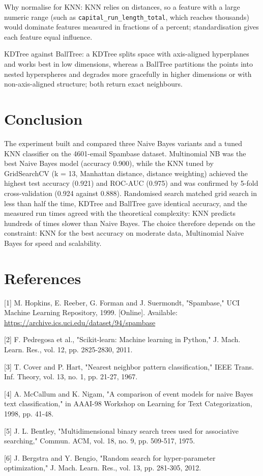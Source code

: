 \documentclass[11pt]{article}
\begin{document}
Why normalise for KNN: KNN relies on distances, so a feature with a large numeric range
(such as \texttt{capital\_run\_length\_total}, which reaches thousands) would dominate features
measured in fractions of a percent; standardisation gives each feature equal influence.

KDTree against BallTree: a KDTree splits space with axis-aligned hyperplanes and works best
in low dimensions, whereas a BallTree partitions the points into nested hyperspheres and
degrades more gracefully in higher dimensions or with non-axis-aligned structure; both
return exact neighbours.

\section*{Conclusion}
\label{sec:org12415b3}


The experiment built and compared three Naive Bayes variants and a tuned KNN classifier on
the 4601-email Spambase dataset. Multinomial NB was the best Naive Bayes model (accuracy
0.900), while the KNN tuned by GridSearchCV (k = 13, Manhattan distance, distance weighting)
achieved the highest test accuracy (0.921) and ROC-AUC (0.975) and was confirmed by 5-fold
cross-validation (0.924 against 0.888). Randomised search matched grid search in less than
half the time, KDTree and BallTree gave identical accuracy, and the measured run times
agreed with the theoretical complexity: KNN predicts hundreds of times slower than Naive
Bayes. The choice therefore depends on the constraint: KNN for the best accuracy on moderate
data, Multinomial Naive Bayes for speed and scalability.

\section*{References}
\label{sec:org562d9f9}


[1] M. Hopkins, E. Reeber, G. Forman and J. Suermondt, "Spambase," UCI Machine Learning Repository, 1999. [Online]. Available: \url{https://archive.ics.uci.edu/dataset/94/spambase}

[2] F. Pedregosa et al., "Scikit-learn: Machine learning in Python," J. Mach. Learn. Res., vol. 12, pp. 2825-2830, 2011.

[3] T. Cover and P. Hart, "Nearest neighbor pattern classification," IEEE Trans. Inf. Theory, vol. 13, no. 1, pp. 21-27, 1967.

[4] A. McCallum and K. Nigam, "A comparison of event models for naive Bayes text classification," in AAAI-98 Workshop on Learning for Text Categorization, 1998, pp. 41-48.

[5] J. L. Bentley, "Multidimensional binary search trees used for associative searching," Commun. ACM, vol. 18, no. 9, pp. 509-517, 1975.

[6] J. Bergstra and Y. Bengio, "Random search for hyper-parameter optimization," J. Mach. Learn. Res., vol. 13, pp. 281-305, 2012.
\end{document}
